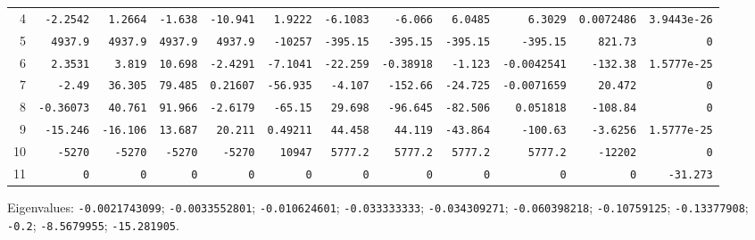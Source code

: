 \begin{landscape}
\begin{tabular}{rrrrrrrrrrrr}
4 & \texttt{-2.2542} & \texttt{1.2664} & \texttt{-1.638} & \texttt{-10.941} & \texttt{1.9222} & \texttt{-6.1083} & \texttt{-6.066} & \texttt{6.0485} & \texttt{6.3029} & \texttt{0.0072486} & \texttt{3.9443e-26} \\

5 & \texttt{4937.9} & \texttt{4937.9} & \texttt{4937.9} & \texttt{4937.9} & \texttt{-10257} & \texttt{-395.15} & \texttt{-395.15} & \texttt{-395.15} & \texttt{-395.15} & \texttt{821.73} & \texttt{0} \\

6 & \texttt{2.3531} & \texttt{3.819} & \texttt{10.698} & \texttt{-2.4291} & \texttt{-7.1041} & \texttt{-22.259} & \texttt{-0.38918} & \texttt{-1.123} & \texttt{-0.0042541} & \texttt{-132.38} & \texttt{1.5777e-25} \\

7 & \texttt{-2.49} & \texttt{36.305} & \texttt{79.485} & \texttt{0.21607} & \texttt{-56.935} & \texttt{-4.107} & \texttt{-152.66} & \texttt{-24.725} & \texttt{-0.0071659} & \texttt{20.472} & \texttt{0} \\

8 & \texttt{-0.36073} & \texttt{40.761} & \texttt{91.966} & \texttt{-2.6179} & \texttt{-65.15} & \texttt{29.698} & \texttt{-96.645} & \texttt{-82.506} & \texttt{0.051818} & \texttt{-108.84} & \texttt{0} \\

9 & \texttt{-15.246} & \texttt{-16.106} & \texttt{13.687} & \texttt{20.211} & \texttt{0.49211} & \texttt{44.458} & \texttt{44.119} & \texttt{-43.864} & \texttt{-100.63} & \texttt{-3.6256} & \texttt{1.5777e-25} \\

10 & \texttt{-5270} & \texttt{-5270} & \texttt{-5270} & \texttt{-5270} & \texttt{10947} & \texttt{5777.2} & \texttt{5777.2} & \texttt{5777.2} & \texttt{5777.2} & \texttt{-12202} & \texttt{0} \\

11 & \texttt{0} & \texttt{0} & \texttt{0} & \texttt{0} & \texttt{0} & \texttt{0} & \texttt{0} & \texttt{0} & \texttt{0} & \texttt{0} & \texttt{-31.273} \\

\bottomrule\end{tabular}\par\endgroup

{\scriptsize Eigenvalues: \texttt{-0.0021743099}; \texttt{-0.0033552801}; \texttt{-0.010624601}; \texttt{-0.033333333}; \texttt{-0.034309271}; \texttt{-0.060398218}; \texttt{-0.10759125}; \texttt{-0.13377908}; \texttt{-0.2}; \texttt{-8.5679955}; \texttt{-15.281905}.\par}


\end{landscape}
